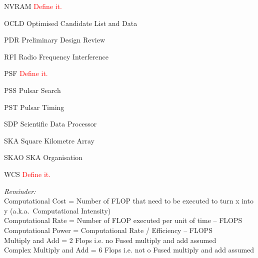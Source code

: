 \documentclass[11pt,a4paper]{article}
\begin{document}
\begin{basedescript}{\desclabelstyle{\pushlabel}\desclabelwidth{6em}}
    \item[NVRAM] \textcolor{red}{Define it.} \vspace{-0.2cm}
    \item[OCLD] Optimised Candidate List and Data \vspace{-0.2cm}
    \item[PDR] Preliminary Design Review\vspace{-0.2cm}
    \item[RFI] Radio Frequency Interference\vspace{-0.2cm}
    \item[PSF] \textcolor{red}{Define it.} \vspace{-0.2cm}
    \item[PSS] Pulsar Search\vspace{-0.2cm}
    \item[PST] Pulsar Timing\vspace{-0.2cm}
    \item[SDP] Scientific Data Processor\vspace{-0.2cm}
    \item[SKA] Square Kilometre Array\vspace{-0.2cm}
    \item[SKAO] SKA Organisation\vspace{-0.2cm}
    \item[WCS] \textcolor{red}{Define it.} \vspace{-0.2cm}
\end{basedescript} 

\noindent \emph{Reminder:}\\
Computational Cost = Number of FLOP that need to be executed to turn x into y (a.k.a.\ Computational Intensity)\\
Computational Rate = Number of FLOP executed per unit of time -- FLOPS\\
Computational Power = Computational Rate / Efficiency -- FLOPS\\
Multiply and Add = 2 Flops i.e. no Fused multiply and add assumed \\
Complex Multiply and Add = 6 Flops i.e. not o Fused multiply and add assumed\\
\end{document}
